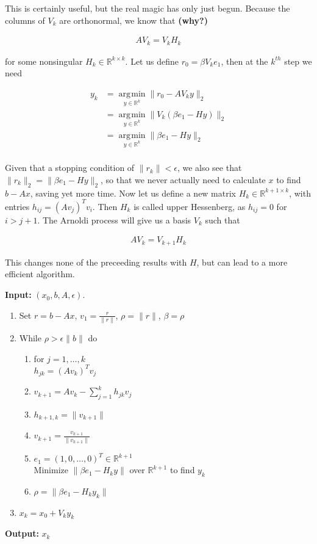 \documentclass[11pt]{article}
\DeclareMathOperator*{\argmin}{\arg\!\min}
\begin{document}
This is certainly useful, but the real magic has only just begun. Because the columns of $V_k$ are orthonormal, we know that \textbf{(why?)}

\begin{align*}
  AV_k = V_k H_k
\end{align*}

for some nonsingular $H_k \in \mathbb{R}^{k \times k}$. Let us define $r_0 = \beta V_k e_1$, then at the $k^{th}$ step we need

\begin{align*}
  y_k &= \argmin \limits_{y \in \mathbb{R}^k} \| r_0 - A V_k y\|_2 \\
  &= \argmin \limits_{y \in \mathbb{R}^k} \| V_k( \beta e_1 - H y)\|_2 \\
  &= \argmin \limits_{y \in \mathbb{R}^k} \| \beta e_1 - H y\|_2 \\
\end{align*}

Given that a stopping condition of $\| r_k \| < \epsilon$, we also see that $\| r_k \|_2 = \| \beta e_1 - H y\|_2$, so that we never actually need to calculate $x$ to find $b - Ax$, saving yet more time. Now let us define a new matrix $H_k \in \mathbb{R}^{k+1 \times k}$, with entries $h_{ij} = (Av_j)^Tv_i$. Then $H_k$ is called upper Hessenberg, as $h_{ij} = 0$ for $i > j + 1$. The Arnoldi process will give us a basis $V_k$ such that

\begin{align*}
  A V_k = V_{k+1} H_k
\end{align*}

This changes none of the preceeding results with $H$, but can lead to a more efficient algorithm. 

\textbf{Input:} $(x_0, b, A, \epsilon)$.
\begin{enumerate}
\item Set $r = b - Ax$, $v_1 = \frac{r}{\| r \|}$, $\rho = \| r \|$, $\beta = \rho$
\item While $\rho > \epsilon \| b \|$ do
  \begin{enumerate}
  \item for $j = 1, \dots, k$ \\
    $h_{jk} = (A v_k)^T v_j$
  \item $v_{k+1} = A v_k - \sum \limits_{j=1}^k h_{jk} v_j$
  \item $h_{k+1,k} = \| v_{k+1} \|$
  \item $ v_{k+1} = \frac{v_{k+1}}{\| v_{k+1} \|}$
  \item $e_1 = (1, 0,\dots, 0)^T \in \mathbb{R}^{k+1}$ \\
    Minimize $\| \beta e_1 - H_k y \|$ over $\mathbb{R}^{k+1}$ to find $y_k$
  \item $\rho = \| \beta e_1 - H_k y_k \|$
\end{enumerate}
\item $x_k = x_0 + V_k y_k$
\end{enumerate}
\textbf{Output:} $x_k$
\end{document}
